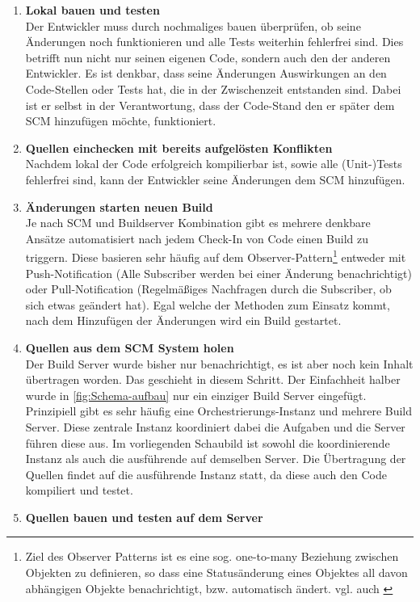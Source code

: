 \begin{enumerate}
		\item \textbf{Lokal bauen und testen}\\%
		Der Entwickler muss durch nochmaliges bauen überprüfen, ob seine Änderungen noch funktionieren und alle Tests weiterhin fehlerfrei sind. Dies betrifft nun nicht nur seinen eigenen Code, sondern auch den der anderen Entwickler. Es ist denkbar, dass seine Änderungen Auswirkungen an den Code-Stellen oder Tests hat, die in der Zwischenzeit entstanden sind. Dabei ist er selbst in der Verantwortung, dass der Code-Stand den er später dem SCM hinzufügen möchte, funktioniert. 
		\item \textbf{Quellen einchecken mit bereits aufgelösten Konflikten}\\%
		Nachdem lokal der Code erfolgreich kompilierbar ist, sowie alle (Unit-)Tests fehlerfrei sind, kann der Entwickler seine Änderungen dem SCM hinzufügen.
		\item \textbf{Änderungen starten neuen Build}\\%
		Je nach SCM und Buildserver Kombination gibt es mehrere denkbare Ansätze automatisiert nach jedem Check-In von Code einen Build zu triggern. Diese basieren sehr häufig auf dem Observer-Pattern\footnote{Ziel des Observer Patterns ist es eine sog. one-to-many Beziehung zwischen Objekten zu definieren, so dass eine Statusänderung eines Objektes all davon abhängigen Objekte benachrichtigt, bzw. automatisch ändert. vgl. auch \cite{hannemann2002design}} entweder mit Push-Notification (Alle Subscriber werden bei einer Änderung benachrichtigt) oder Pull-Notification (Regelmäßiges Nachfragen durch die Subscriber, ob sich etwas geändert hat). Egal welche der Methoden zum Einsatz kommt, nach dem Hinzufügen der Änderungen wird ein Build gestartet.
		\item \textbf{Quellen aus dem SCM System holen}\\%
		Der Build Server wurde bisher nur benachrichtigt, es ist aber noch kein Inhalt übertragen worden. Das geschieht in diesem Schritt. Der Einfachheit halber wurde in \autoref{fig:Schema-aufbau} nur ein einziger Build Server eingefügt. Prinzipiell gibt es sehr häufig eine Orchestrierungs-Instanz und mehrere Build Server. Diese zentrale Instanz koordiniert dabei die Aufgaben und die Server führen diese aus. Im vorliegenden Schaubild ist sowohl die koordinierende Instanz als auch die ausführende auf demselben Server. Die Übertragung der Quellen findet auf die ausführende Instanz statt, da diese auch den Code kompiliert und testet.
		\item \textbf{Quellen bauen und testen auf dem Server}\\%

\end{enumerate}
